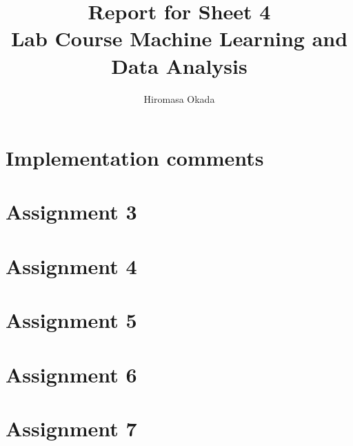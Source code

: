 \documentclass[a4paper,11pt]{article}
\begin{document}
\author{Hiromasa Okada}
\title{\vspace{-2cm}Report for Sheet 4\\
\small{Lab Course Machine Learning and Data Analysis}}
\maketitle

\section*{Implementation comments}




\section*{Assignment 3}



\section*{Assignment 4}

\section*{Assignment 5}

\section*{Assignment 6}

\section*{Assignment 7}
\end{document}
